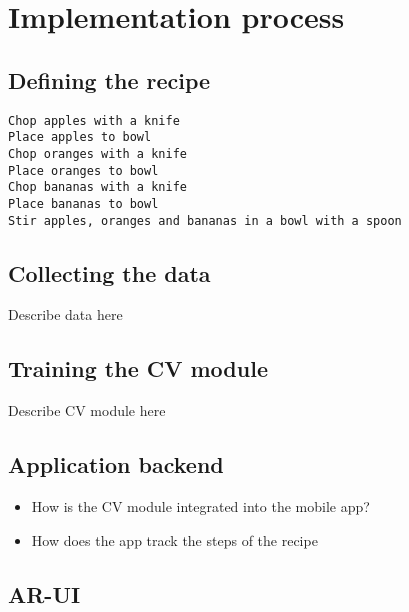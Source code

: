\chapter{Implementation process}\label{implementation}

\section{Defining the recipe}\label{recipe}
\begin{lstlisting}[caption=The recipe,captionpos=b,label=recipelisting]
Chop apples with a knife
Place apples to bowl
Chop oranges with a knife
Place oranges to bowl
Chop bananas with a knife
Place bananas to bowl
Stir apples, oranges and bananas in a bowl with a spoon
\end{lstlisting}

\section{Collecting the data}\label{data}
Describe data here

\section{Training the CV module}\label{training}
Describe CV module here

\section{Application backend}\label{backend}
\begin{itemize}
	\item How is the CV module integrated into the mobile app?
	\item How does the app track the steps of the recipe
\end{itemize}

\section{AR-UI}\label{ar-ui}
